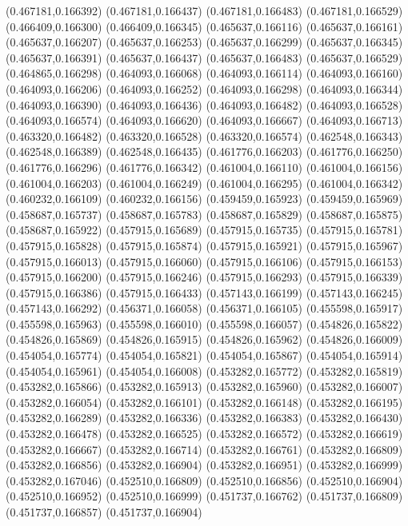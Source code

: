 (0.467181,0.166392)
(0.467181,0.166437)
(0.467181,0.166483)
(0.467181,0.166529)
(0.466409,0.166300)
(0.466409,0.166345)
(0.465637,0.166116)
(0.465637,0.166161)
(0.465637,0.166207)
(0.465637,0.166253)
(0.465637,0.166299)
(0.465637,0.166345)
(0.465637,0.166391)
(0.465637,0.166437)
(0.465637,0.166483)
(0.465637,0.166529)
(0.464865,0.166298)
(0.464093,0.166068)
(0.464093,0.166114)
(0.464093,0.166160)
(0.464093,0.166206)
(0.464093,0.166252)
(0.464093,0.166298)
(0.464093,0.166344)
(0.464093,0.166390)
(0.464093,0.166436)
(0.464093,0.166482)
(0.464093,0.166528)
(0.464093,0.166574)
(0.464093,0.166620)
(0.464093,0.166667)
(0.464093,0.166713)
(0.463320,0.166482)
(0.463320,0.166528)
(0.463320,0.166574)
(0.462548,0.166343)
(0.462548,0.166389)
(0.462548,0.166435)
(0.461776,0.166203)
(0.461776,0.166250)
(0.461776,0.166296)
(0.461776,0.166342)
(0.461004,0.166110)
(0.461004,0.166156)
(0.461004,0.166203)
(0.461004,0.166249)
(0.461004,0.166295)
(0.461004,0.166342)
(0.460232,0.166109)
(0.460232,0.166156)
(0.459459,0.165923)
(0.459459,0.165969)
(0.458687,0.165737)
(0.458687,0.165783)
(0.458687,0.165829)
(0.458687,0.165875)
(0.458687,0.165922)
(0.457915,0.165689)
(0.457915,0.165735)
(0.457915,0.165781)
(0.457915,0.165828)
(0.457915,0.165874)
(0.457915,0.165921)
(0.457915,0.165967)
(0.457915,0.166013)
(0.457915,0.166060)
(0.457915,0.166106)
(0.457915,0.166153)
(0.457915,0.166200)
(0.457915,0.166246)
(0.457915,0.166293)
(0.457915,0.166339)
(0.457915,0.166386)
(0.457915,0.166433)
(0.457143,0.166199)
(0.457143,0.166245)
(0.457143,0.166292)
(0.456371,0.166058)
(0.456371,0.166105)
(0.455598,0.165917)
(0.455598,0.165963)
(0.455598,0.166010)
(0.455598,0.166057)
(0.454826,0.165822)
(0.454826,0.165869)
(0.454826,0.165915)
(0.454826,0.165962)
(0.454826,0.166009)
(0.454054,0.165774)
(0.454054,0.165821)
(0.454054,0.165867)
(0.454054,0.165914)
(0.454054,0.165961)
(0.454054,0.166008)
(0.453282,0.165772)
(0.453282,0.165819)
(0.453282,0.165866)
(0.453282,0.165913)
(0.453282,0.165960)
(0.453282,0.166007)
(0.453282,0.166054)
(0.453282,0.166101)
(0.453282,0.166148)
(0.453282,0.166195)
(0.453282,0.166289)
(0.453282,0.166336)
(0.453282,0.166383)
(0.453282,0.166430)
(0.453282,0.166478)
(0.453282,0.166525)
(0.453282,0.166572)
(0.453282,0.166619)
(0.453282,0.166667)
(0.453282,0.166714)
(0.453282,0.166761)
(0.453282,0.166809)
(0.453282,0.166856)
(0.453282,0.166904)
(0.453282,0.166951)
(0.453282,0.166999)
(0.453282,0.167046)
(0.452510,0.166809)
(0.452510,0.166856)
(0.452510,0.166904)
(0.452510,0.166952)
(0.452510,0.166999)
(0.451737,0.166762)
(0.451737,0.166809)
(0.451737,0.166857)
(0.451737,0.166904)
